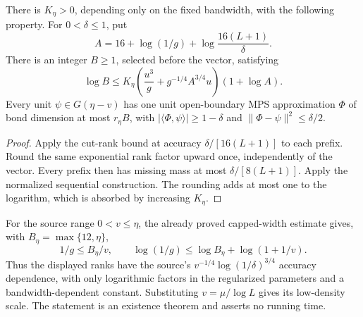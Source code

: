 \begin{lemma}
    \label{lem:ld_sharp_global_mps}
    \leanok
    There is $K_\eta>0$, depending only on the fixed bandwidth,
    with the following property. For $0<\delta\le1$, put
    \[
        A=16+\log(1/g)+\log\frac{16(L+1)}\delta.
    \]
    There is an integer $B\ge1$, selected before the vector, satisfying
    \[
        \log B\le K_\eta
        \left(\frac{u^3}{g}+g^{-1/4}A^{3/4}u\right)(1+\log A).
    \]
    Every unit $\psi\in G(\eta-v)$ has one unit open-boundary MPS
    approximation $\Phi$ of bond dimension at most $r_\eta B$,
    with $|\langle\Phi,\psi\rangle|\ge1-\delta$ and
    $\|\Phi-\psi\|^2\le\delta/2$.
\end{lemma}
\begin{proof}\leanok
    Apply the cut-rank bound at accuracy $\delta/[16(L+1)]$ to each
    prefix. Round the same exponential rank factor upward once,
    independently of the vector. Every prefix then has missing mass
    at most $\delta/[8(L+1)]$. Apply the normalized sequential
    construction. The rounding adds at most one to the logarithm,
    which is absorbed by increasing $K_\eta$.
\end{proof}

For the source range $0<v\le\eta$, the already proved capped-width
estimate gives, with $B_\eta=\max\{12,\eta\}$,
\[
    1/g\le B_\eta/v,\qquad
    \log(1/g)\le\log B_\eta+\log(1+1/v).
\]
Thus the displayed ranks have the source's
$v^{-1/4}\log(1/\delta)^{3/4}$ accuracy dependence, with only
logarithmic factors in the regularized parameters and a bandwidth-dependent
constant. Substituting $v=\mu/\log L$ gives its low-density scale.
The statement is an existence theorem and asserts no running time.
